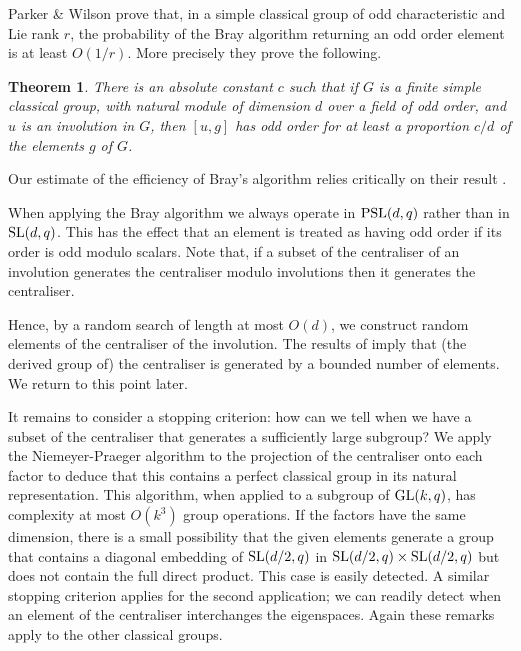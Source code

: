 \documentclass[12pt]{article}
\newtheorem{theorem}[definition]{Theorem}
\def\SL{{\rm SL}}
\def\GL{{\rm GL}}
\def\PSL{{\rm PSL}}
\begin{document}
Parker \& Wilson \cite{PW05} prove that,
in a simple classical group of odd characteristic and Lie rank $r$, 
the probability of the Bray algorithm returning an odd 
order element is at least $O(1/r)$. 
More precisely they prove the following.
\begin{theorem}\label{clasthm}
There is an absolute constant $c$ such that if $G$ is a finite
simple classical group, with natural module
of dimension $d$ over a field of odd order,
and $u$ is an involution in $G$, then $[u,g]$ has odd order
for at least a proportion $c/d$ of the elements $g$ of $G$.
\end{theorem}

Our estimate of the efficiency of Bray's algorithm relies critically 
on their result .

When applying the Bray algorithm we always operate in $\PSL(d,q)$
rather than in $\SL(d,q)$.  This has the effect that an element is
treated as having odd order if its order is odd modulo scalars.
Note that, if a subset of the centraliser of an involution generates
the centraliser modulo involutions then it generates the centraliser.

Hence, by a random search of length at most $O(d)$, we construct
random elements of the centraliser of the involution. The results of 
\cite{lish} imply that (the derived group of) the centraliser is generated 
by a bounded number of elements.   We return to this point later.

It remains to consider a stopping criterion: how can we tell when we
have a subset of the centraliser that generates a sufficiently large
subgroup?  %
We apply the Niemeyer-Praeger algorithm \cite{NP} to 
the projection of the centraliser onto
each factor to deduce that this 
contains a perfect classical group in its natural representation.
This algorithm, when applied to a subgroup of $\GL(k,q)$,
has complexity at most $O(k^3)$ group operations. If the factors have the
same dimension, there is a small possibility that the given elements
generate a group that contains a diagonal embedding of $\SL(d/2,q)$
in $\SL(d/2,q)\times\SL(d/2,q)$ but does not contain the full direct product.
This case is easily detected. A similar stopping criterion applies for the
second application; we can readily detect when an element
of the centraliser interchanges the eigenspaces.
Again these remarks apply to the other classical groups.
\end{document}

